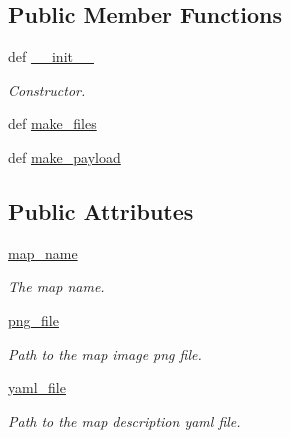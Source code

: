 \subsection*{Public Member Functions}
\begin{DoxyCompactItemize}
\item 
def \hyperlink{classRappCloud_1_1CloudMsgs_1_1PathPlanningUploadMap_1_1PathPlanningUploadMap_1_1Request_a7a4f3e6d9b2c8cbe4fef633126e302b8}{\-\_\-\-\_\-init\-\_\-\-\_\-}
\begin{DoxyCompactList}\small\item\em Constructor. \end{DoxyCompactList}\item 
def \hyperlink{classRappCloud_1_1CloudMsgs_1_1PathPlanningUploadMap_1_1PathPlanningUploadMap_1_1Request_af4c27eaa056449e341fddf1964857e86}{make\-\_\-files}
\item 
def \hyperlink{classRappCloud_1_1CloudMsgs_1_1PathPlanningUploadMap_1_1PathPlanningUploadMap_1_1Request_a730c7d9a01b11d64c8aae25221b044be}{make\-\_\-payload}
\end{DoxyCompactItemize}
\subsection*{Public Attributes}
\begin{DoxyCompactItemize}
\item 
\hyperlink{classRappCloud_1_1CloudMsgs_1_1PathPlanningUploadMap_1_1PathPlanningUploadMap_1_1Request_a932896aae94dbf140750c13a92f2efbd}{map\-\_\-name}
\begin{DoxyCompactList}\small\item\em The map name. \end{DoxyCompactList}\item 
\hyperlink{classRappCloud_1_1CloudMsgs_1_1PathPlanningUploadMap_1_1PathPlanningUploadMap_1_1Request_abccaa837456250c6bed5b219b1d02fbc}{png\-\_\-file}
\begin{DoxyCompactList}\small\item\em Path to the map image png file. \end{DoxyCompactList}\item 
\hyperlink{classRappCloud_1_1CloudMsgs_1_1PathPlanningUploadMap_1_1PathPlanningUploadMap_1_1Request_a287933cb420663c144b6fb33ba0827dd}{yaml\-\_\-file}
\begin{DoxyCompactList}\small\item\em Path to the map description yaml file. \end{DoxyCompactList}\end{DoxyCompactItemize}


